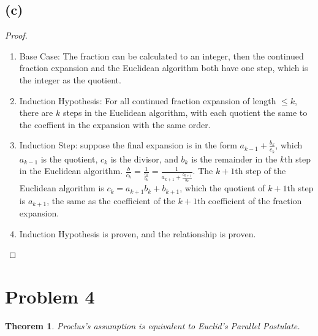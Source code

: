 \documentclass{article}
\newtheorem{theorem}{Theorem}
\begin{document}
\subsection*{(c)}

\begin{proof}
~
\begin{enumerate}
    \item Base Case: The fraction can be calculated to an integer, then the continued fraction expansion and the Euclidean algorithm both have one step, which is the integer as the quotient.

    \item Induction Hypothesis: For all continued fraction expansion of length \(\leq k\), there are \(k\) steps in the Euclidean algorithm, with each quotient the same to the coeffient in the expansion with the same order.

    \item Induction Step: suppose the final expansion is in the form \(a_{k-1}+\frac{b_k}{c_k}\), which \(a_{k-1}\) is the quotient, \(c_{k}\) is the divisor, and \(b_k\) is the remainder in the \(k\)th step in the Euclidean algorithm. \(\frac{b}{c_k}=\frac{1}{\frac{c_k}{b_k}}=\frac{1}{a_{k+1}+\frac{b_{k+1}}{b_k}}\). The \(k+1\)th step of the Euclidean algorithm is \(c_k= a_{k
    +1} b_{k}+b_{k+1}\), which the quotient of \(k+1\)th step is \(a_{k+1}\), the same as the coefficient of the \(k+1\)th coefficient of the fraction expansion.

    \item Induction Hypothesis is proven, and the relationship is proven.
\end{enumerate}
\end{proof}

\newpage

\section*{Problem 4}

\begin{theorem}
Proclus's assumption is equivalent to Euclid's Parallel Postulate.
\end{theorem}
\end{document}
